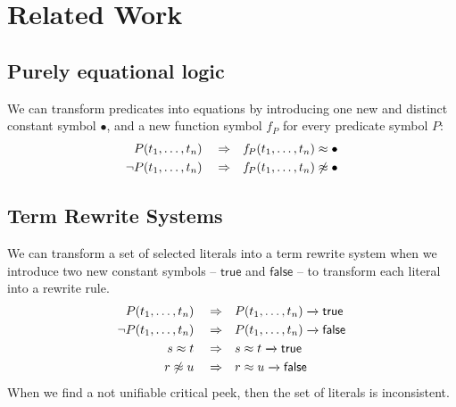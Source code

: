 
\chapter{Related Work}


\section{Purely equational logic}

We can transform predicates into equations
by introducing one new and distinct constant symbol $\bullet$,
and a new function symbol $f\!_P$ for every predicate symbol $P$:
\begin{align*}
	P(t_1,\ldots,t_n) \quad\Rightarrow&\quad f\!_P(t_1,\ldots,t_n) \approx \bullet \\ 
	\lnot P(t_1,\ldots,t_n) \quad\Rightarrow&\quad f\!_P(t_1,\ldots,t_n) \not\approx \bullet
\end{align*}

\section{Term Rewrite Systems}

We can transform a set of selected literals into a term rewrite system 
when we introduce two new constant symbols -- $\mathsf{true}$ and $\mathsf{false}$ --
to transform each literal into a rewrite rule.
\begin{align*}
P(t_1,\ldots,t_n) \quad\Rightarrow &\quad P(t_1,\ldots,t_n) \xrightarrow[{}]{} \mathsf{true} 
\\ 
\lnot P(t_1,\ldots,t_n) \quad\Rightarrow &\quad P(t_1,\ldots,t_n) \xrightarrow[{}]{} \mathsf{false} 
\\
s \approx t \quad\Rightarrow&\quad s \approx t\xrightarrow[{}]{} \mathsf{true} 
\\ 
r \not\approx u \quad\Rightarrow&\quad r \approx u\xrightarrow[{}]{}  \mathsf{false}
\end{align*}
When we find a not unifiable critical peek, then the set of literals is inconsistent.


